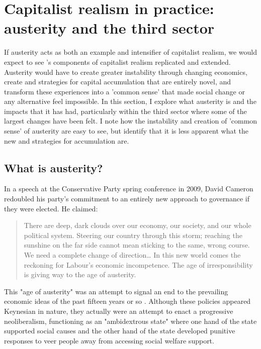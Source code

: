 \section{Capitalist realism in practice: austerity and the third sector}
\label{sec:capitalist-realism-in-practice-austerity-and-the-third-sector}
If austerity acts as both an example and intensifier of capitalist realism, we would expect to see \citet{shonkwiler_reading_2014}'s components of capitalist realism replicated and extended. Austerity would have to create greater instability through changing economics, create  and strategies for capital accumulation that are entirely novel, and transform these experiences into a 'common sense' that made social change or any alternative feel impossible. In this section, I explore what austerity is and the impacts that it has had, particularly within the third sector where some of the largest changes have been felt. I note how the instability and creation of 'common sense' of austerity are easy to see, but identify that it is less apparent what the new  and strategies for accumulation are.    

\subsection{What is austerity?}
\label{subsec:what-is-austerity}

In a speech at the Conservative Party spring conference in 2009, David Cameron redoubled his party's commitment to an entirely new approach to governance if they were elected. He claimed:

\begin{quote}
There are deep, dark clouds over our economy, our society, and our whole political system. Steering our country through this storm; reaching the sunshine on the far side cannot mean sticking to the same, wrong course. We need a complete change of direction\ldots{} In this new world comes the reckoning for Labour's economic incompetence. The age of irresponsibility is giving way to the age of austerity. \citep{cameron_age_2009}
\end{quote}

This "age of austerity" was an attempt to signal an end to the prevailing economic ideas of the past fifteen years or so \citep{blyth_austerity_2013}. Although these policies appeared Keynesian in nature, they actually were an attempt to enact a progressive neoliberalism, functioning as an "ambidextrous state" \citep[X]{peck_zombie_2010} where one hand of the state supported social causes and the other  hand of the state developed punitive responses to veer people away from accessing social welfare support.

